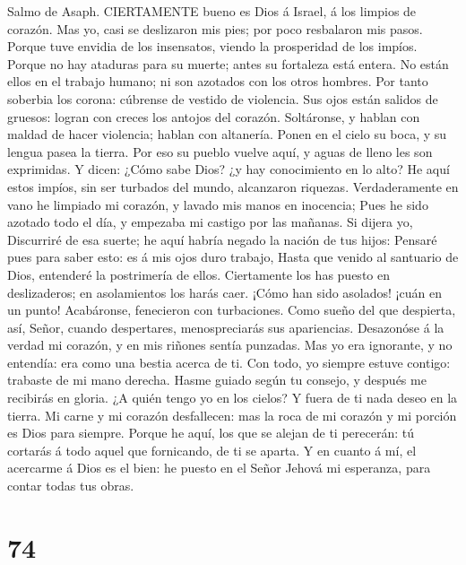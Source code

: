  Salmo de Asaph. CIERTAMENTE bueno es Dios á Israel, á los
limpios de corazón.  Mas yo, casi se deslizaron mis pies;
por poco resbalaron mis pasos.  Porque tuve envidia de los
insensatos, viendo la prosperidad de los impíos.  Porque no
hay ataduras para su muerte; antes su fortaleza está entera.
 No están ellos en el trabajo humano; ni son azotados con
los otros hombres.  Por tanto soberbia los corona: cúbrense
de vestido de violencia.  Sus ojos están salidos de gruesos:
logran con creces los antojos del corazón.  Soltáronse, y
hablan con maldad de hacer violencia; hablan con altanería. 
Ponen en el cielo su boca, y su lengua pasea la tierra. 
Por eso su pueblo vuelve aquí, y aguas de lleno les son exprimidas.
 Y dicen: ¿Cómo sabe Dios? ¿y hay conocimiento en lo alto?
 He aquí estos impíos, sin ser turbados del mundo,
alcanzaron riquezas.  Verdaderamente en vano he limpiado mi
corazón, y lavado mis manos en inocencia;  Pues he sido
azotado todo el día, y empezaba mi castigo por las mañanas.
 Si dijera yo, Discurriré de esa suerte; he aquí habría
negado la nación de tus hijos:  Pensaré pues para saber
esto: es á mis ojos duro trabajo,  Hasta que venido al
santuario de Dios, entenderé la postrimería de ellos. 
Ciertamente los has puesto en deslizaderos; en asolamientos los harás
caer.  ¡Cómo han sido asolados! ¡cuán en un punto!
Acabáronse, fenecieron con turbaciones.  Como sueño del que
despierta, así, Señor, cuando despertares, menospreciarás sus
apariencias.  Desazonóse á la verdad mi corazón, y en mis
riñones sentía punzadas.  Mas yo era ignorante, y no
entendía: era como una bestia acerca de ti.  Con todo, yo
siempre estuve contigo: trabaste de mi mano derecha.  Hasme
guiado según tu consejo, y después me recibirás en gloria. 
¿A quién tengo yo en los cielos? Y fuera de ti nada deseo en la tierra.
 Mi carne y mi corazón desfallecen: mas la roca de mi
corazón y mi porción es Dios para siempre.  Porque he aquí,
los que se alejan de ti perecerán: tú cortarás á todo aquel que
fornicando, de ti se aparta.  Y en cuanto á mí, el
acercarme á Dios es el bien: he puesto en el Señor Jehová mi esperanza,
para contar todas tus obras.

\hypertarget{section-73}{%
\section{74}\label{section-73}}

